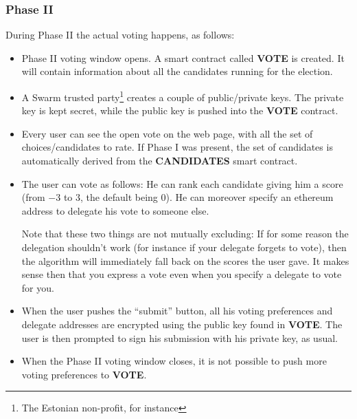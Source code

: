 \documentclass[submission, copyright,creativecommons,sharealike,noncommercial]{eptcs}
\newcommand{\Candidates}{\textbf{CANDIDATES}\xspace}
\newcommand{\Vote}{\textbf{VOTE}\xspace}
\begin{document}
\subsubsection{Phase II}\label{subsubsec:Intuitive Phase II}
%
	During Phase II the actual voting happens, as follows:
	\begin{itemize}
		\item Phase II voting window opens. A smart contract called \Vote is created. It will contain information about all the candidates running for the election.
		\item A Swarm trusted party\footnote{The Estonian non-profit, for instance} creates a couple of public/private keys. The private key is kept secret, while the public key is pushed into the \Vote contract.
		\item Every user can see the open vote on the web page, with all the set of choices/candidates to rate. If Phase I was present, the set of candidates is automatically derived from the \Candidates smart contract. 
		\item The user can vote as follows: He can rank each candidate giving him a score (from $-3$ to $3$, the default being $0$). He can moreover specify an ethereum address to delegate his vote to someone else. 
		
		Note that these two things are not mutually excluding: If for some reason the delegation shouldn't work (for instance if your delegate forgets to vote), then the algorithm will immediately fall back on the scores the user gave. It makes sense then that you express a vote even when you specify a delegate to vote for you.
		\item When the user pushes the ``submit'' button, all his voting preferences and delegate addresses are encrypted using the public key found in \Vote. The user is then prompted to sign his submission with his private key, as usual.
		\item When the Phase II voting window closes, it is not possible to push more voting preferences to \Vote.
	\end{itemize}
%
%
\end{document}
